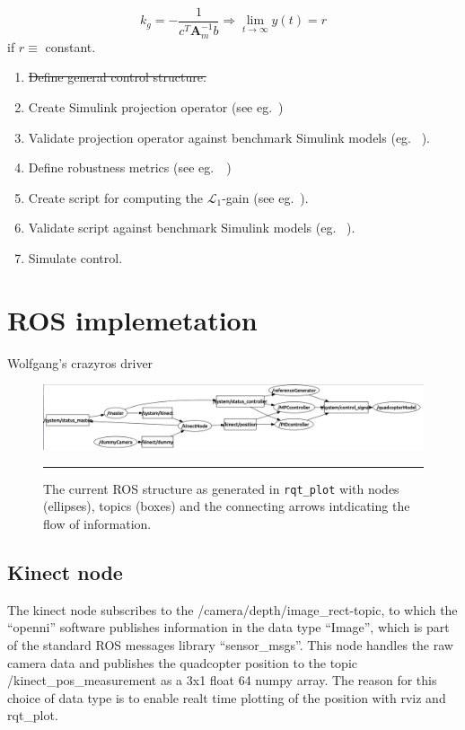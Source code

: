 \documentclass{article}
\begin{document}
\begin{equation}
k_g =-\frac{1}{c^T\mathbf{A}_m^{-1}b} \Rightarrow \lim_{t\rightarrow\infty}y(t) = r
\end{equation}
if $r \equiv$ constant.
\begin{enumerate}
\subsubsection*{TODO}
\item \sout{Define general control structure.}
\item Create Simulink projection operator (see eg.~\cite{L1control})
\item Validate projection operator against benchmark Simulink models (eg. ~\cite{cao2006design}).
\item Define robustness metrics (see eg.~\cite{L1control}~\cite{huynh20141})
\item Create script for computing the $\mathcal{L}_1$-gain (see eg.~\cite{L1control}).
\item Validate script against benchmark Simulink models (eg. ~\cite{cao2006design}).
\item Simulate control.
\end{enumerate}

\section{ROS implemetation}
Wolfgang's crazyros driver~\cite{HoenigMixedReality2015}

\begin{figure}[htbp]
\centering
\includegraphics[width=\textwidth,trim={1mm 0 0 0.7mm},clip]{figures/ROSstruct.png}
\rule{35em}{0.5pt}
\caption{The current ROS structure as generated in \texttt{rqt\_plot} with nodes (ellipses), topics (boxes) and the connecting arrows intdicating the flow of information.}
\label{fig:ROSstruct}
\end{figure}
\subsection{Kinect node}
The kinect node subscribes to the /camera/depth/image\_rect-topic, to which the ``openni'' software publishes information in the data type ``Image'', which is part of the standard ROS messages library ``sensor\_msgs''. This node handles the raw camera data and publishes the quadcopter position to the topic /kinect\_pos\_measurement as a 3x1 float 64 numpy array. The reason for this choice of data type is to enable realt time plotting of the position with rviz and rqt\_plot.
\end{document}
